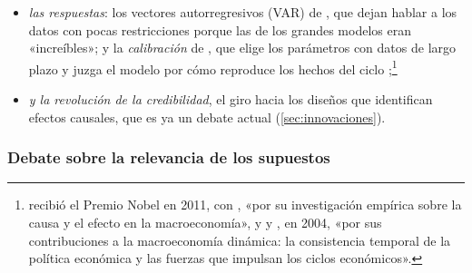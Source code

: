 \documentclass[11pt]{article}
\begin{document}
\begin{itemize}
\begin{itemize}
  \item \emph{las respuestas}: los vectores autorregresivos (VAR) de \textcite{Sims1980Macroeconomics}, que dejan hablar a los datos con pocas restricciones porque las de los grandes modelos eran «increíbles»; y la \emph{calibración} de \textcite{KydlandPrescott1996Computational}, que elige los parámetros con datos de largo plazo y juzga el modelo por cómo reproduce los hechos del ciclo ;\footnote{ recibió el Premio Nobel en 2011, con , «por su investigación empírica sobre la causa y el efecto en la macroeconomía»\nocite{Nobel2011SargentSims}, y  y , en 2004, «por sus contribuciones a la macroeconomía dinámica: la consistencia temporal de la política económica y las fuerzas que impulsan los ciclos económicos»\nocite{Nobel2004KydlandPrescott}.}
  \item \emph{y la revolución de la credibilidad}, el giro hacia los diseños que identifican efectos causales, que es ya un debate actual (\ref{sec:innovaciones}).
  \end{itemize}
\end{itemize}

\subsubsection{Debate sobre la relevancia de los supuestos}\label{sec:supuestos}
\end{document}
